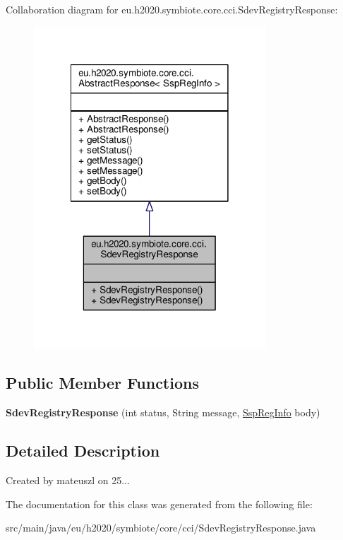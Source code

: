 Collaboration diagram for eu.\+h2020.\+symbiote.\+core.\+cci.\+Sdev\+Registry\+Response\+:
\nopagebreak
\begin{figure}[H]
\begin{center}
\leavevmode
\includegraphics[width=246pt]{classeu_1_1h2020_1_1symbiote_1_1core_1_1cci_1_1SdevRegistryResponse__coll__graph}
\end{center}
\end{figure}
\subsection*{Public Member Functions}
\begin{DoxyCompactItemize}
\item 
\mbox{\label{classeu_1_1h2020_1_1symbiote_1_1core_1_1cci_1_1SdevRegistryResponse_a5f143c87715676885be9d100dd35091a}} 
{\bfseries Sdev\+Registry\+Response} (int status, String message, \hyperlink{classeu_1_1h2020_1_1symbiote_1_1cloud_1_1model_1_1ssp_1_1SspRegInfo}{Ssp\+Reg\+Info} body)
\end{DoxyCompactItemize}


\subsection{Detailed Description}
Created by mateuszl on 25... 

The documentation for this class was generated from the following file\+:\begin{DoxyCompactItemize}
\item 
src/main/java/eu/h2020/symbiote/core/cci/Sdev\+Registry\+Response.\+java\end{DoxyCompactItemize}
